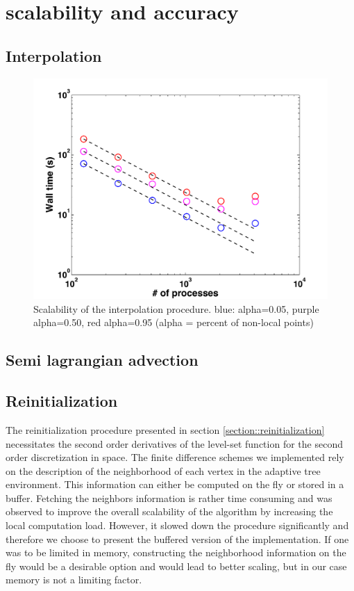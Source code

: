 \section{scalability and accuracy}

\subsection{Interpolation}

\begin{figure}[ht!]
\begin{center}
\includegraphics[width=.7\textwidth]{pictures/scaling_interpolation_all.pdf}
\caption{Scalability of the interpolation procedure. blue: alpha=0.05, purple alpha=0.50, red alpha=0.95 (alpha = percent of non-local points)}
\end{center}
\end{figure}


\subsection{Semi lagrangian advection}

\subsection{Reinitialization} \label{section::scaling_reinitialization}

The reinitialization procedure presented in section \ref{section::reinitialization} necessitates the second order derivatives of the level-set function for the second order discretization in space. The finite difference schemes we implemented rely on the description of the neighborhood of each vertex in the adaptive tree environment. This information can either be computed on the fly or stored in a buffer. Fetching the neighbors information is rather time consuming and was observed to improve the overall scalability of the algorithm by increasing the local computation load. However, it slowed down the procedure significantly and therefore we choose to present the buffered version of the implementation. If one was to be limited in memory, constructing the neighborhood information on the fly would be a desirable option and would lead to better scaling, but in our case memory is not a limiting factor.


